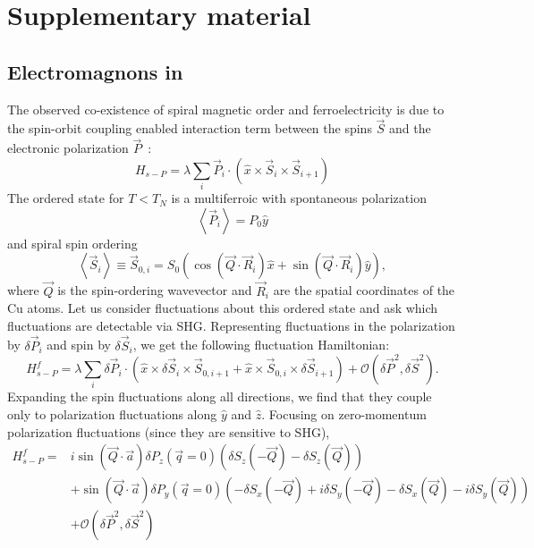 \section{Supplementary material}

\subsection{Electromagnons in }\label{cubrtwo-sup:pimpliess}
The observed co-existence of spiral magnetic order and ferroelectricity is due to the spin-orbit coupling enabled interaction term between the spins $\vec S$ and the electronic polarization $\vec P$~\cite{}:
\begin{equation}
    H_{s-P} = \lambda \sum_i \vec P_i \cdot (\hat x \times \vec S_i \times \vec S_{i+1})
\end{equation}
The ordered state for $T<T_N$ is a multiferroic with spontaneous polarization
\begin{equation}
\left<\vec P_i\right> = P_0 \hat y
\end{equation}
and spiral spin ordering
\begin{equation}
\left< \vec S_i\right> \equiv \vec S_{0,i} = S_0 \left( \cos (\vec Q \cdot \vec R_i) \hat x + \sin (\vec Q \cdot \vec R_i) \hat y\right),
\end{equation}
where $\vec Q$ is the spin-ordering wavevector and $\vec R_i$ are the spatial coordinates of the Cu atoms.
Let us consider fluctuations about this ordered state and ask which fluctuations are detectable via SHG.
Representing fluctuations in the polarization by $\delta \vec P_i$ and spin by $\delta \vec S_i$, we get the following fluctuation Hamiltonian:
\begin{equation}\label{cubrtwo-eq:fluctuationhamiltonian}
    H^f_{s-P} = \lambda \sum_i \delta \vec P_i \cdot (\hat x \times \delta \vec S_i \times \vec S_{0,i+1} + \hat x \times \vec S_{0,i} \times \delta \vec S_{i+1}) + \mathcal{O}(\delta \vec P^2, \delta \vec S^2).
\end{equation}
Expanding the spin fluctuations along all directions, we find that they couple only to polarization fluctuations along $\hat y$ and $\hat z$.
Focusing on zero-momentum polarization fluctuations (since they are sensitive to SHG),
\begin{equation}\label{cubrtwo-eq:ftfluctuationhamiltonian}
\begin{aligned}
H^f_{s-P} = &i \sin (\vec Q \cdot \vec a) \delta P_z(\vec q=0) \left(\delta S_z(-\vec Q) - \delta S_z (\vec Q) \right)\\
&+\sin (\vec Q \cdot \vec a) \delta P_y(\vec q=0) \left( -\delta S_x(-\vec Q) + i\delta S_y(-\vec Q) - \delta S_x(\vec Q) - i\delta S_y(\vec Q) \right)\\
& + \mathcal{O}(\delta \vec P^2, \delta \vec S^2)
\end{aligned}
\end{equation}
